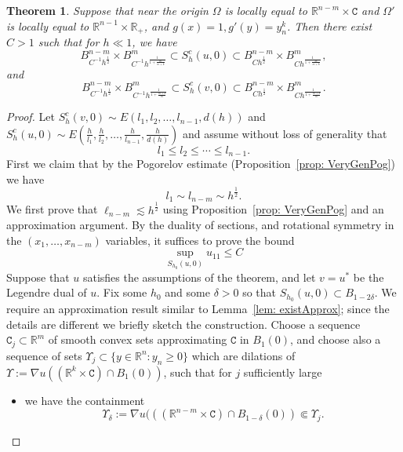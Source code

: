 \documentclass[12pt,reqno]{amsart}
\newtheorem{theorem}{Theorem}[section]
\numberwithin{equation}{section}
\begin{document}
\begin{theorem}\label{thm: secMixedHomog}
    Suppose that near the origin $\Omega$ is locally equal to $\mathbb R^{n-m}\times \mathtt C$ and $\Omega'$ is locally equal to $\mathbb R^{n-1}\times\mathbb R_+$, and $g(x) =1, g'(y) = y_n^k$. Then there exist $C>1$ such that for $h\ll1$, we have
    \[B_{C^{-1}h^{\frac 1 2}}^{n-m}\times B_{C^{-1}h^{\frac{1}{1+\frac{m}{m+k}}}}^m\subset S_h^c(u, 0)\subset B_{Ch^{\frac 1 2}}^{n-m}\times B_{Ch^{\frac{1}{1+\frac{m}{m+k}}}}^m,\]
    and
    \[B_{C^{-1}h^{\frac 1 2}}^{n-m}\times B_{C^{-1}h^{\frac{1}{1+\frac{m+k}{m}}}}^m\subset S_h^c(v, 0)\subset B_{Ch^{\frac 1 2}}^{n-m}\times B_{Ch^{\frac{1}{1+\frac{m+k}{m}}}}^m.\]
\end{theorem}

\begin{proof}

Let $S_h^c(v, 0)\sim E(l_1, l_2, \ldots, l_{n-1}, d(h))$ and $S_h^c(u, 0)\sim E(\frac{h}{l_1}, \frac{h}{l_2}, \ldots, \frac{h}{l_{n-1}}, \frac{h}{d(h)})$ and assume without loss of generality that
\[l_1\leq l_2\leq\cdots\leq l_{n-1}.\]  First we claim that by the Pogorelov estimate (Proposition~\ref{prop: VeryGenPog}) we have 
\begin{equation}\label{eq: secShapeFlatDirections}
l_1\sim l_{n-m}\sim h^{\frac{1}{2}}. 
\end{equation}
We first prove that $\ell_{n-m} \lesssim h^{\frac{1}{2}}$ using Proposition~\ref{prop: VeryGenPog} and an approximation argument.  By the duality of sections, and rotational symmetry in the $(x_1,\ldots, x_{n-m})$ variables, it suffices to prove the bound
\[
\sup_{S_{h_0}(u,0)} u_{11} \leq C
\]
Suppose that $u$ satisfies the assumptions of the theorem, and let $v=u^*$ be the Legendre dual of $u$.  Fix some $h_0$ and some $\delta >0$ so that $S_{h_0}(u,0) \subset B_{1-2\delta}$.  We require an approximation result similar to Lemma~\ref{lem: existApprox}; since the details are different we briefly sketch the construction.  Choose a sequence $\mathtt{C}_j \subset \mathbb{R}^{m}$ of smooth convex sets approximating $\mathtt{C}$ in $B_1(0)$, and choose also a sequence of sets $\Upsilon_j\subset \{y \in \mathbb{R}^n: y_n \geq 0\}$  which are dilations of  $\Upsilon:= \nabla u((\mathbb{R}^k\times \mathtt{C})\cap B_1(0))$, such that for $j$ sufficiently large
\begin{itemize}
\item we have the containment
\[
\Upsilon_{\delta}:=\nabla u(((\mathbb{R}^{n-m}\times \mathtt{C}) \cap B_{1-\delta}(0)) \Subset \Upsilon_{j}. 
\]


\end{itemize}
\end{proof}
\end{document}

